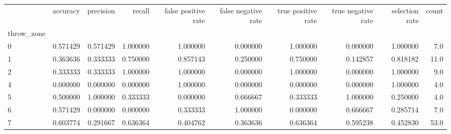 \begin{tabular}{lrrrrrrrrr}
\toprule
{} &  accuracy &  precision &    recall &  false positive rate &  false negative rate &  true positive rate &  true negative rate &  selection rate &  count \\
throw\_zone &           &            &           &                      &                      &                     &                     &                 &        \\
\midrule
0          &  0.571429 &   0.571429 &  1.000000 &             1.000000 &             0.000000 &            1.000000 &            0.000000 &        1.000000 &    7.0 \\
1          &  0.363636 &   0.333333 &  0.750000 &             0.857143 &             0.250000 &            0.750000 &            0.142857 &        0.818182 &   11.0 \\
2          &  0.333333 &   0.333333 &  1.000000 &             1.000000 &             0.000000 &            1.000000 &            0.000000 &        1.000000 &    9.0 \\
4          &  0.000000 &   0.000000 &  0.000000 &             1.000000 &             0.000000 &            0.000000 &            0.000000 &        1.000000 &    4.0 \\
5          &  0.500000 &   1.000000 &  0.333333 &             0.000000 &             0.666667 &            0.333333 &            1.000000 &        0.250000 &    4.0 \\
6          &  0.571429 &   0.000000 &  0.000000 &             0.333333 &             1.000000 &            0.000000 &            0.666667 &        0.285714 &    7.0 \\
7          &  0.603774 &   0.291667 &  0.636364 &             0.404762 &             0.363636 &            0.636364 &            0.595238 &        0.452830 &   53.0 \\
\bottomrule
\end{tabular}
